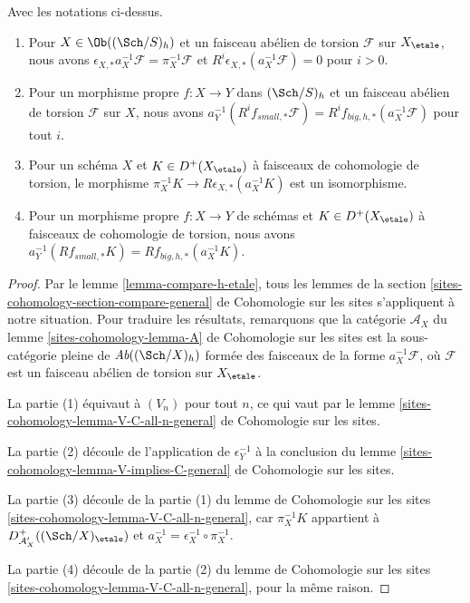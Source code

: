 \begin{lemma}
\label{lemma-V-C-all-n-etale-h}
Avec les notations ci-dessus.
\begin{enumerate}
\item Pour $X \in \Ob((\Sch/S)_{h})$ et un faisceau abélien de torsion $\mathcal{F}$
sur $X_\etale$, nous avons
$\epsilon_{X, *}a_X^{-1}\mathcal{F} = \pi_X^{-1}\mathcal{F}$
et $R^i\epsilon_{X, *}(a_X^{-1}\mathcal{F}) = 0$ pour $i > 0$.
\item Pour un morphisme propre $f : X \to Y$ dans $(\Sch/S)_h$
et un faisceau abélien de torsion $\mathcal{F}$ sur $X$, nous avons
$a_Y^{-1}(R^if_{small, *}\mathcal{F}) =
R^if_{big, h, *}(a_X^{-1}\mathcal{F})$
pour tout $i$.
\item Pour un schéma $X$ et $K \in D^+(X_\etale)$ à faisceaux de
cohomologie de torsion, le morphisme
$\pi_X^{-1}K \to R\epsilon_{X, *}(a_X^{-1}K)$ est un isomorphisme.
\item Pour un morphisme propre $f : X \to Y$ de schémas
et $K \in D^+(X_\etale)$ à faisceaux de cohomologie de torsion, nous avons
$a_Y^{-1}(Rf_{small, *}K) = Rf_{big, h, *}(a_X^{-1}K)$.
\end{enumerate}
\end{lemma}

\begin{proof}
Par le lemme \ref{lemma-compare-h-etale}, tous les lemmes de la
section \ref{sites-cohomology-section-compare-general} de Cohomologie sur les sites
s'appliquent à notre situation. Pour traduire les résultats,
remarquons que la catégorie $\mathcal{A}_X$ du
lemme \ref{sites-cohomology-lemma-A} de Cohomologie sur les sites
est la sous-catégorie pleine de $\textit{Ab}((\Sch/X)_h)$
formée des faisceaux de la forme $a_X^{-1}\mathcal{F}$,
où $\mathcal{F}$ est un faisceau abélien de torsion sur $X_\etale$.

\medskip\noindent
La partie (1) équivaut à $(V_n)$ pour tout $n$, ce qui vaut par le
lemme \ref{sites-cohomology-lemma-V-C-all-n-general} de Cohomologie sur les sites.

\medskip\noindent
La partie (2) découle de l'application de $\epsilon_Y^{-1}$ à la conclusion du
lemme \ref{sites-cohomology-lemma-V-implies-C-general} de Cohomologie sur les sites.

\medskip\noindent
La partie (3) découle de la partie (1) du lemme de Cohomologie sur les sites
\ref{sites-cohomology-lemma-V-C-all-n-general},
car $\pi_X^{-1}K$ appartient à $D^+_{\mathcal{A}'_X}((\Sch/X)_\etale)$
et $a_X^{-1} = \epsilon_X^{-1} \circ \pi_X^{-1}$.

\medskip\noindent
La partie (4) découle de la partie (2) du lemme de Cohomologie sur les sites
\ref{sites-cohomology-lemma-V-C-all-n-general},
pour la même raison.
\end{proof}

